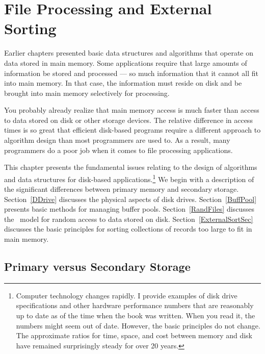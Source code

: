 
\chapter{File Processing and External Sorting}
\label{FileProc}

\def\CHHEAD{Chap.\ \thechapter\ File Processing and External Sorting}

Earlier chapters presented basic data structures and algorithms
that operate on data stored in main memory.
Some applications require that large amounts of information be stored
and processed --- so much information that it cannot all fit into main
memory.
In that case, the information must reside on disk and be brought into
main memory selectively for processing.

You probably already realize that main memory access is much faster
than access to data stored on disk or other storage devices.
The relative difference in access times is so great that
efficient disk-based programs require a different approach to
algorithm design than most programmers are used to.
As a result, many programmers do a poor job when it comes to file
processing applications.

This chapter presents the fundamental issues relating to the design of 
algorithms and data structures for disk-based
applications.\footnote{
Computer technology changes rapidly.
I provide examples of disk drive specifications and other hardware
performance numbers that are reasonably up to date as of the time when
the book was written.
When you read it, the numbers might seem out of date.
However, the basic principles do not change.
The approximate ratios for time, space, and cost between memory and
disk have remained surprisingly steady for over 20 years.}
We begin with a description of the significant differences
between primary memory and secondary storage.
Section~\ref{DDrive} discusses the
physical aspects of disk drives.
Section~\ref{BuffPool} presents basic methods for managing buffer
pools.
Section~\ref{RandFiles} discusses the \Lang\ model for random access
to data stored on disk.
Section~\ref{ExternalSortSec} discusses the basic principles for sorting
collections of records too large to fit in main
memory.

\section{Primary versus Secondary Storage}
\label{PrimVsSec}

